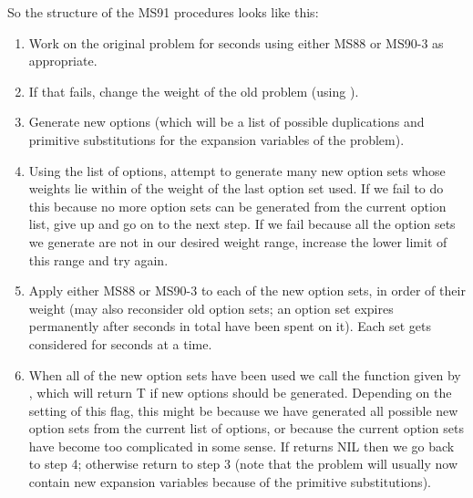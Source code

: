 So the structure of the MS91 procedures looks like this:
\begin{enumerate}
\item Work on the original problem for 
seconds using either MS88 or MS90-3 as appropriate.

\item If that fails, change the weight of the old problem (using ).

\item Generate new options (which will be a list of possible duplications and
primitive substitutions for the expansion variables of the problem).

\item Using the list of options, attempt to generate  many
new option sets whose weights lie within  of the
weight of the last option set used. If we fail to do this because no more option
sets can be generated from the current option list, give up and go on to the next step.
If we fail because all the option sets we generate are not in our desired weight range,
increase the lower limit of this range and try again.

\item Apply either MS88 or MS90-3 to each of the new option sets, in order of their
weight (may also reconsider old option sets; an option set expires permanently after 
seconds in total have been spent on it). Each set gets considered for
 seconds at a time.

\item When all of the new option sets have been used we call
the function given by , which will return T if new options should be
generated. Depending on the setting of this flag, this might be because we have generated all
possible new option sets from the current list of options, or because the current option sets
have become too complicated in some sense. If  returns NIL
then we go back to step 4; otherwise
return to step 3 (note that the problem will usually now contain new expansion variables
because of the primitive substitutions).
\end{enumerate}

